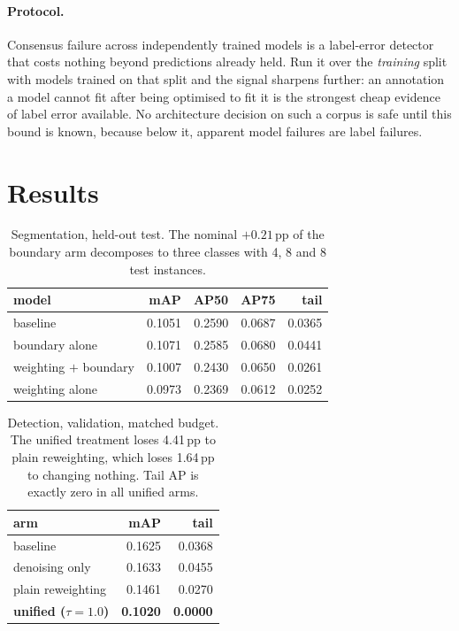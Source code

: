 \documentclass[10pt,twocolumn,letterpaper]{article}
\begin{document}
\paragraph{Protocol.} Consensus failure across independently trained models is
a label-error detector that costs nothing beyond predictions already held. Run
it over the \emph{training} split with models trained on that split and the
signal sharpens further: an annotation a model cannot fit after being
optimised to fit it is the strongest cheap evidence of label error available.
No architecture decision on such a corpus is safe until this bound is known,
because below it, apparent model failures are label failures.

\section{Results}

\begin{table}[t]
\centering\small
\begin{tabular}{lrrrr}
\toprule
model & mAP & AP50 & AP75 & tail \\
\midrule
baseline & 0.1051 & 0.2590 & 0.0687 & 0.0365 \\
boundary alone & 0.1071 & 0.2585 & 0.0680 & 0.0441 \\
weighting $+$ boundary & 0.1007 & 0.2430 & 0.0650 & 0.0261 \\
weighting alone & 0.0973 & 0.2369 & 0.0612 & 0.0252 \\
\bottomrule
\end{tabular}
\caption{Segmentation, held-out test. The nominal $+0.21$\,pp of the boundary
arm decomposes to three classes with 4, 8 and 8 test instances.}
\end{table}

\begin{table}[t]
\centering\small
\begin{tabular}{lrr}
\toprule
arm & mAP & tail \\
\midrule
baseline & 0.1625 & 0.0368 \\
denoising only & 0.1633 & 0.0455 \\
plain reweighting & 0.1461 & 0.0270 \\
\textbf{unified ($\tau=1.0$)} & \textbf{0.1020} & \textbf{0.0000} \\
\bottomrule
\end{tabular}
\caption{Detection, validation, matched budget. The unified treatment loses
4.41\,pp to plain reweighting, which loses 1.64\,pp to changing nothing. Tail AP
is exactly zero in all unified arms.}
\end{table}
\end{document}
